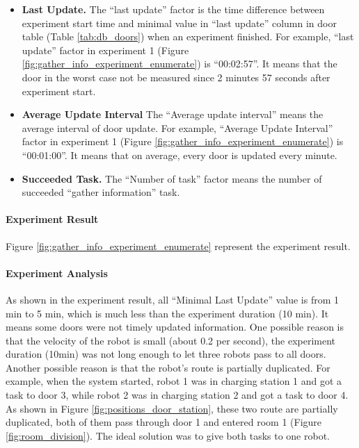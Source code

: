 \begin{itemize}
 \item \textbf{Last Update.} The ``last update'' factor is the time difference between experiment start time and minimal value in ``last update'' column in door table (Table \ref{tab:db_doors}) when an experiment finished. For example, ``last update'' factor in experiment 1 (Figure \ref{fig:gather_info_experiment_enumerate}) is ``00:02:57''. It means that the door in the worst case not be measured since 2 minutes 57 seconds after experiment start.
 \item \textbf{Average Update Interval} The ``Average update interval'' means the average interval of door update. For example, ``Average Update Interval'' factor in experiment 1 (Figure \ref{fig:gather_info_experiment_enumerate}) is ``00:01:00''. It means that on average, every door is updated every minute.
 \item \textbf{Succeeded Task.} The ``Number of task'' factor means the number of succeeded ``gather information'' task.
\end{itemize}

\paragraph{Experiment Result} 
Figure \ref{fig:gather_info_experiment_enumerate} represent the experiment result.

\paragraph{Experiment Analysis} 

As shown in the experiment result, all ``Minimal Last Update'' value is from 1 min to 5 min, which is much less than the experiment duration (10 min). It means some doors were not timely updated information. One possible reason is that the velocity of the robot is small (about 0.2 per second), the experiment duration (10min) was not long enough to let three robots pass to all doors. Another possible reason is that the robot's route is partially duplicated. For example, when the system started, robot 1 was in charging station 1 and got a task to door 3, while robot 2 was in charging station 2 and got a task to door 4. As shown in Figure \ref{fig:positions_door_station}, these two route are partially duplicated, both of them pass through door 1 and entered room 1 (Figure \ref{fig:room_division}). The ideal solution was to give both tasks to one robot. 


